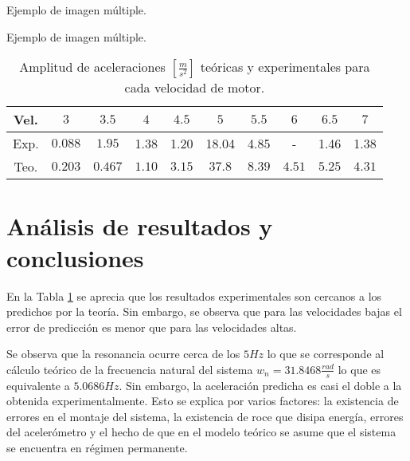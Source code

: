 \documentclass[letterpaper,11pt]{article} %
\begin{document}
\newpage
\begin{images}[\label{imagenmultiple}]{Ejemplo de imagen múltiple.}
\end{images}
\begin{images}[\label{imagenmultiple}]{Ejemplo de imagen múltiple.}
\end{images}
\newpage
\begin{table}[hbt]
    \centering
    \begin{tabular}{c|c|c|c|c|c|c|c|c|c}
        Vel.&$3$&$3.5$&$4$&$4.5$&$5$&$5.5$&$6$&$6.5$&$7$\\
        \hline
          Exp.&$0.088$&$1.95$&1.38&1.20&18.04&4.85&-&1.46&1.38\\
          Teo.&$0.203$&$0.467$&$1.10$&$3.15$&$37.8$&$8.39$&$4.51$&$5.25$&$4.31$
         
    \end{tabular}
    \caption{Amplitud de aceleraciones $[\frac{m}{s^2}]$ teóricas y experimentales para cada velocidad de motor.}
    \label{tab:ffff}
\end{table}
\section{Análisis de resultados y conclusiones}
En la Tabla \ref{tab:ffff} se aprecia que los resultados experimentales son cercanos a los predichos por la teoría.  Sin embargo, se observa que para las velocidades bajas el error de predicción es menor que para las velocidades altas.

Se observa que la resonancia ocurre cerca de los $5 Hz$ lo que se corresponde al cálculo teórico de la frecuencia natural del sistema $w_n=31.8468 \frac{rad}{s}$ lo que es equivalente a $5.0686 Hz$.  Sin embargo, la aceleración predicha es casi el doble a la obtenida experimentalmente.  Esto se explica por varios factores: la existencia de errores en el montaje del sistema, la existencia de roce que disipa energía, errores del acelerómetro y el hecho de que en el modelo teórico se asume que el sistema se encuentra en régimen permanente. 
\end{document}
